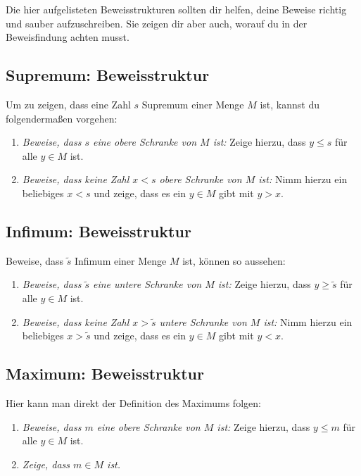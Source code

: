\documentclass[fontsize=9pt,
               parskip=half-,
               DIV=14,
               listof=chapterentry,
               tocflat]{scrbook}
\begin{document}
Die hier aufgelisteten Beweisstrukturen sollten dir helfen, deine Beweise richtig und sauber aufzuschreiben. Sie zeigen dir aber auch, worauf du in der Beweisfindung achten musst.

\subsection{Supremum: Beweisstruktur}

Um zu zeigen, dass eine Zahl $s$ Supremum einer Menge $M$ ist, kannst du folgendermaßen vorgehen:

\begin{enumerate}
\item \emph{Beweise, dass $s$ eine obere Schranke von $M$ ist:} Zeige hierzu, dass $y\leq s$ für alle $y\in M$ ist.
\item \emph{Beweise, dass keine Zahl $x<s$ obere Schranke von $M$ ist:} Nimm hierzu ein beliebiges $x<s$ und zeige, dass es ein $y\in M$ gibt mit $y>x$.
\end{enumerate}

\subsection{Infimum: Beweisstruktur}

Beweise, dass ${\tilde {s}}$ Infimum einer Menge $M$ ist, können so aussehen:

\begin{enumerate}
\item \emph{Beweise, dass ${\tilde {s}}$ eine untere Schranke von $M$ ist:} Zeige hierzu, dass $y\geq {\tilde {s}}$ für alle $y\in M$ ist.
\item \emph{Beweise, dass keine Zahl $x>{\tilde {s}}$ untere Schranke von $M$ ist:} Nimm hierzu ein beliebiges $x>{\tilde {s}}$ und zeige, dass es ein $y\in M$ gibt mit $y<x$.
\end{enumerate}

\subsection{Maximum: Beweisstruktur}

Hier kann man direkt der Definition des Maximums folgen:

\begin{enumerate}
\item \emph{Beweise, dass $m$ eine obere Schranke von $M$ ist:} Zeige hierzu, dass $y\leq m$ für alle $y\in M$ ist.
\item \emph{Zeige, dass $m\in M$ ist.}
\end{enumerate}
\end{document}
